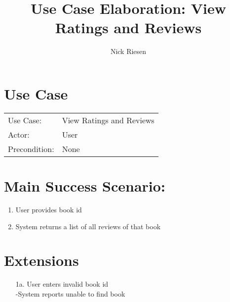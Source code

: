 \documentclass{article}
\title{Use Case Elaboration: View Ratings and Reviews}
\author{ Nick Riesen }
\begin{document}
\maketitle


\section*{Use Case}
\begin{tabular}{l l}
Use Case:     & View Ratings and Reviews      \\
Actor:        & User                          \\
Precondition: & None                          \\
\end{tabular}


\section*{Main Success Scenario:}

\begin{enumerate}
    \item  User provides book id
    \item System returns a list of all reviews of that book

\end{enumerate}

\section*{Extensions}

\begin{itemize}
    \item [1a.] User enters invalid book id \\
        -System reports unable to find book

\end{itemize}
\end{document}
